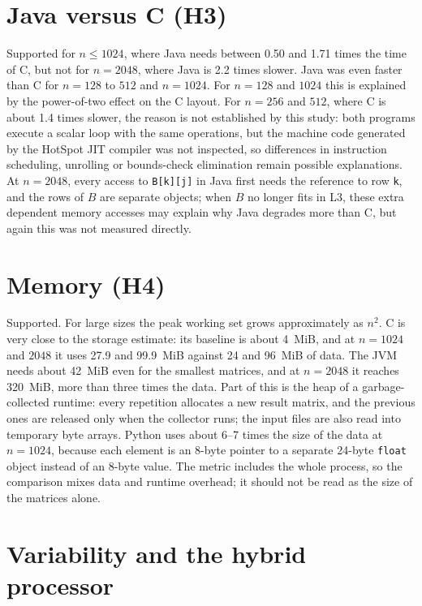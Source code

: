 \documentclass[12pt,a4paper]{report}
\begin{document}
\section{Java versus C (H3)}

Supported for $n \leq 1024$, where Java needs between 0.50 and 1.71 times the time of C, but not for $n = 2048$, where
Java is 2.2 times slower. Java was even faster than C for $n = 128$ to $512$ and $n = 1024$. For $n = 128$ and $1024$ this
is explained by the power-of-two effect on the C layout. For $n = 256$ and $512$, where C is about 1.4 times slower, the
reason is not established by this study: both programs execute a scalar loop with the same operations, but the machine
code generated by the HotSpot JIT compiler was not inspected, so differences in instruction scheduling, unrolling or
bounds-check elimination remain possible explanations. At $n = 2048$, every access to \texttt{B[k][j]} in Java first
needs the reference to row \texttt{k}, and the rows of $B$ are separate objects; when $B$ no longer fits in L3, these
extra dependent memory accesses may explain why Java degrades more than C, but again this was not measured directly.

\section{Memory (H4)}

Supported. For large sizes the peak working set grows approximately as $n^2$. C is very close to the storage estimate:
its baseline is about 4~MiB, and at $n = 1024$ and $2048$ it uses 27.9 and 99.9~MiB against 24 and 96~MiB of data. The
JVM needs about 42~MiB even for the smallest matrices, and at $n = 2048$ it reaches 320~MiB, more than three times the
data. Part of this is the heap of a garbage-collected runtime: every repetition allocates a new result matrix, and the
previous ones are released only when the collector runs; the input files are also read into temporary byte arrays.
Python uses about 6--7 times the size of the data at $n = 1024$, because each element is an 8-byte pointer to a separate
24-byte \texttt{float} object instead of an 8-byte value. The metric includes the whole process, so the comparison
mixes data and runtime overhead; it should not be read as the size of the matrices alone.

\section{Variability and the hybrid processor}
\end{document}
